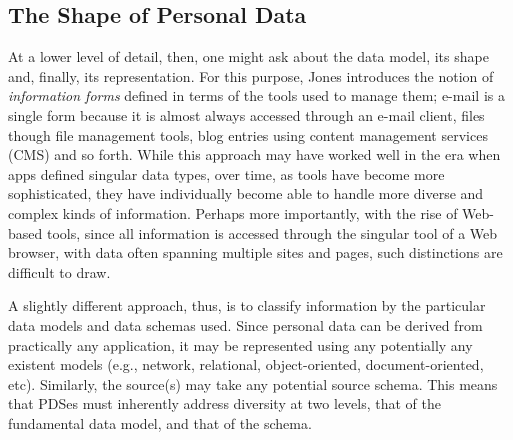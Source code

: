 \documentclass[runningheads,a4paper]{llncs}
\begin{document}
\subsection{The Shape of Personal Data}


At a lower level of detail, then, one might ask about the data model, its shape and, finally, its representation.  For this purpose, Jones introduces the notion of \emph{information forms} defined in terms of the tools used to manage them; e-mail is a single form because it is almost always accessed through an e-mail client, files though file management tools, blog entries using content management services (CMS) and so forth.  While this approach may have worked well in the era when apps defined singular data types, over time, as tools have become more sophisticated, they have individually become  able to handle more diverse and complex kinds of information.  Perhaps more importantly, with the rise of Web-based tools, since all information is accessed through the singular tool of a Web browser, with data often spanning multiple sites and pages, such distinctions are difficult to draw.

A slightly different approach, thus, is to classify information by the particular data models and data schemas used.  Since personal data can be derived from practically any application, it may be represented using any potentially any existent models (e.g., network, relational, object-oriented, document-oriented, etc). Similarly, the source(s) may take any potential source schema.  This means that PDSes must inherently address diversity at two levels, that of the fundamental data model, and that of the schema.
\end{document}
